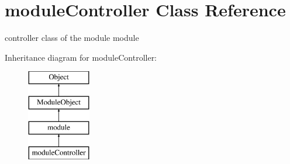 \hypertarget{classmoduleController}{}\section{module\+Controller Class Reference}
\label{classmoduleController}


controller class of the module module  


Inheritance diagram for module\+Controller\+:\begin{figure}[H]
\begin{center}
\leavevmode
\includegraphics[height=4.000000cm]{classmoduleController}
\end{center}
\end{figure}

